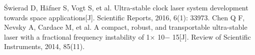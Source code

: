 \begin{thebibliography}{99}  
 Świerad D, Häfner S, Vogt S, et al. Ultra-stable clock laser system development towards space applications[J]. Scientific Reports, 2016, 6(1): 33973.
 Chen Q F, Nevsky A, Cardace M, et al. A compact, robust, and transportable ultra-stable laser with a fractional frequency instability of 1× 10− 15[J]. Review of Scientific Instruments, 2014, 85(11).
\end{thebibliography}

